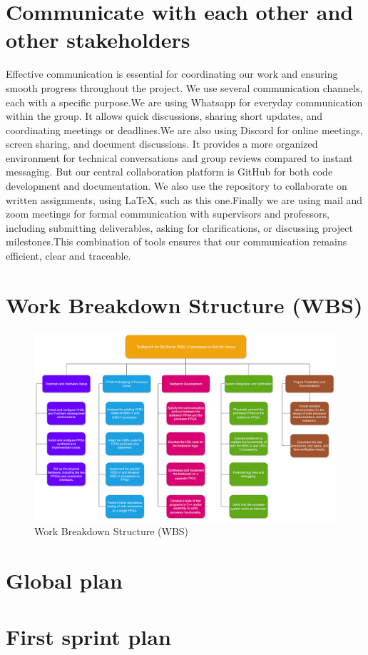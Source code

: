 \documentclass[10pt,twocolumn]{article}
\begin{document}
\section{Communicate with each other and other stakeholders}
Effective communication is essential for coordinating our work and ensuring smooth progress throughout the project. We use several communication channels, each with a specific purpose.We are using Whatsapp for everyday communication within the group. It allows quick discussions, sharing short updates, and coordinating meetings or deadlines.We are also using Discord for online meetings, screen sharing, and document discussions. It provides a more organized environment for technical conversations and group reviews compared to instant messaging.
But our central collaboration platform is GitHub for both code development and documentation. We also use the repository to collaborate on written assignments, using LaTeX, such as this one.Finally we are using mail and zoom meetings for formal communication with supervisors and professors, including submitting deliverables, asking for clarifications, or discussing project milestones.This combination of tools ensures that our communication remains efficient, clear and traceable.

\FloatBarrier
\section{Work Breakdown Structure (WBS)}
\begin{figure}[t]
\centering
\includegraphics[width=\linewidth]{WBS.png}
\caption{Work Breakdown Structure (WBS)}
\label{fig:timeline}
\end{figure}

\section{Global plan}
\subsection{}
\section{First sprint plan}
\end{document}
